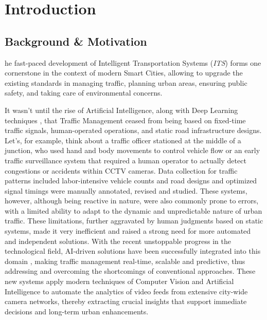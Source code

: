 \chapter{Introduction}
\label{chap:Introduction}

\section{Background \& Motivation}
\lettrine[findent=2pt]{{}}{ }he fast-paced development of Intelligent Transportation Systems (\textit{ITS}) forms one cornerstone in the context of modern Smart Cities, allowing to upgrade the existing standards in managing traffic, planning urban areas, ensuring public safety, and taking care of environmental concerns.

It wasn't until the rise of Artificial Intelligence, along with Deep Learning techniques \cite{CityFlow, AggregatingGlobalLocal, MultiLevelProgressiveLearning}, that Traffic Management ceased from being based on fixed-time traffic signals, human-operated operations, and static road infrastructure designs. Let's, for example, think about a traffic officer stationed at the middle of a junction, who used hand and body movements to control vehicle flow or an early traffic surveillance system that required a human operator to actually detect congestions or accidents within CCTV cameras. Data collection for traffic patterns included labor-intensive vehicle counts and road designs and optimized signal timings were manually annotated, revised and studied. These systems, however, although being reactive in nature, were also commonly prone to errors, with a limited ability to adapt to the dynamic and unpredictable nature of urban traffic. These limitations, further aggravated by human judgments based on static systems, made it very inefficient and raised a strong need for more automated and independent solutions. With the recent unstoppable progress in the technological field, AI-driven solutions have been successfully integrated into this domain \cite{SelfSupervisedGeometricFeatures, MsKAT}, making traffic management real-time, scalable and predictive, thus addressing and overcoming the shortcomings of conventional approaches. These new systems apply modern techniques of Computer Vision and Artificial Intelligence to automate the analytics of video feeds from extensive city-wide camera networks, thereby extracting crucial insights that support immediate decisions and long-term urban enhancements.

